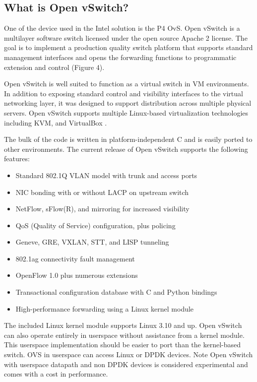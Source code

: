 \documentclass[../sn.tex]{subfiles}
\begin{document}
\subsection{What is Open vSwitch?}
One of the device used in the Intel solution is the P4 OvS.
Open vSwitch is a multilayer software switch licensed under the open source Apache 2 license. 
The goal is to implement a production quality switch platform that supports standard management interfaces and opens the forwarding functions to programmatic extension and control (Figure 4).

Open vSwitch is well suited to function as a virtual switch in VM environments. 
In addition to exposing standard control and visibility interfaces to the virtual networking layer, it was designed to support distribution across multiple physical servers. 
Open vSwitch supports multiple Linux-based virtualization technologies including KVM, and VirtualBox \cite{ovs}.

The bulk of the code is written in platform-independent C and is easily ported to other environments. The current release of Open vSwitch supports the following features:
\begin{itemize}
    \item Standard 802.1Q VLAN model with trunk and access ports
    \item NIC bonding with or without LACP on upstream switch
    \item NetFlow, sFlow(R), and mirroring for increased visibility
    \item QoS (Quality of Service) configuration, plus policing
    \item Geneve, GRE, VXLAN, STT, and LISP tunneling
    \item 802.1ag connectivity fault management
    \item OpenFlow 1.0 plus numerous extensions
    \item Transactional configuration database with C and Python bindings
    \item High-performance forwarding using a Linux kernel module
\end{itemize} The included Linux kernel module supports Linux 3.10 and up.
Open vSwitch can also operate entirely in userspace without assistance from a kernel module. 
This userspace implementation should be easier to port than the kernel-based switch.
OVS in userspace can access Linux or DPDK devices. Note Open vSwitch with userspace datapath and non DPDK devices is considered experimental and comes with a cost in performance.
\end{document}
